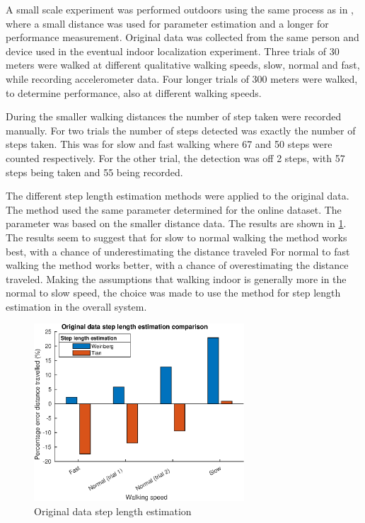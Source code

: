 A small scale experiment was performed outdoors using the same process as in \cite{Vezocnik2019}, where a small distance was used for parameter estimation and a longer for performance measurement. Original data was collected from the same person and device used in the eventual indoor localization experiment. Three trials of 30 meters were walked at different qualitative walking speeds, slow, normal and fast, while recording accelerometer data. Four longer trials of 300 meters were walked, to determine performance, also at different walking speeds. \par 
During the smaller walking distances the number of step taken were recorded manually. For two trials the number of steps detected was exactly the number of steps taken. This was for slow and fast walking where 67 and 50 steps were counted respectively.  For the other trial, the detection was off 2 steps, with 57 steps being taken and 55 being recorded. \par 
The different step length estimation methods were applied to the original data. The \citet{Tian2016} method used the same parameter determined for the online dataset. The \citet{Weinberg2002} parameter was based on the smaller distance data. The results are shown in \cref{fig:step_length_personal_testing}. The results seem to suggest that for slow to normal walking the \citet{Tian2016} method works best, with a chance of underestimating the distance traveled For normal to fast walking the \citet{Weinberg2002} method works better, with a chance of overestimating the distance traveled. Making the assumptions that walking indoor is generally more in the normal to slow speed, the choice was made to use the \citet{Tian2016} method for step length estimation in the overall system.
\begin{figure}[H]
	\centering
	\includegraphics[width=0.7\textwidth]{images/20201113_1920_wienberg_vs_tian_og_data_1}
	\caption{Original data step length estimation \\ }
	\label{fig:step_length_personal_testing}
\end{figure}


